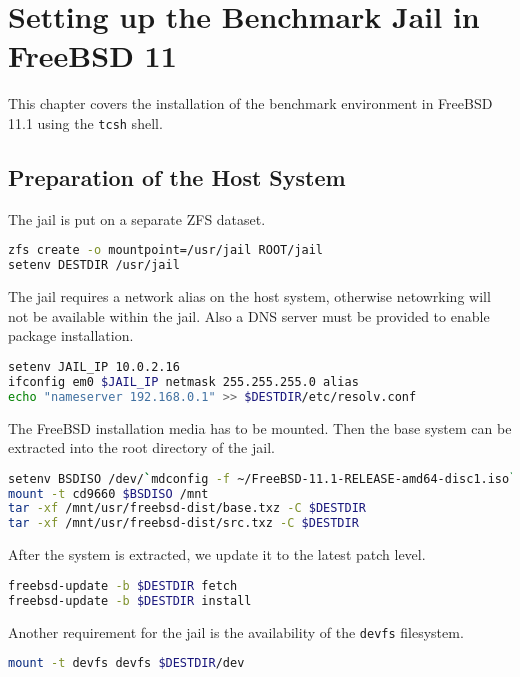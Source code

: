 \chapter{Setting up the Benchmark Jail in FreeBSD 11}
\label{jail-setup}

This chapter covers the installation of the benchmark environment in FreeBSD 11.1 using the \texttt{tcsh} shell.

\section*{Preparation of the Host System}

The jail is put on a separate ZFS dataset.

\begin{lstlisting}[language=bash]
zfs create -o mountpoint=/usr/jail ROOT/jail
setenv DESTDIR /usr/jail
\end{lstlisting}

The jail requires a network alias on the host system, otherwise netowrking will not be available within the jail.
Also a DNS server must be provided to enable package installation.

\begin{lstlisting}[language=bash]
setenv JAIL_IP 10.0.2.16
ifconfig em0 $JAIL_IP netmask 255.255.255.0 alias
echo "nameserver 192.168.0.1" >> $DESTDIR/etc/resolv.conf
\end{lstlisting}

The FreeBSD installation media has to be mounted. Then the base system can be extracted into the root directory of the jail.

\begin{lstlisting}[language=bash]
setenv BSDISO /dev/`mdconfig -f ~/FreeBSD-11.1-RELEASE-amd64-disc1.iso`
mount -t cd9660 $BSDISO /mnt
tar -xf /mnt/usr/freebsd-dist/base.txz -C $DESTDIR
tar -xf /mnt/usr/freebsd-dist/src.txz -C $DESTDIR
\end{lstlisting}

After the system is extracted, we update it to the latest patch level.

\begin{lstlisting}[language=bash]
freebsd-update -b $DESTDIR fetch
freebsd-update -b $DESTDIR install
\end{lstlisting}

Another requirement for the jail is the availability of the \texttt{devfs} filesystem.

\begin{lstlisting}[language=bash]
mount -t devfs devfs $DESTDIR/dev
\end{lstlisting}

